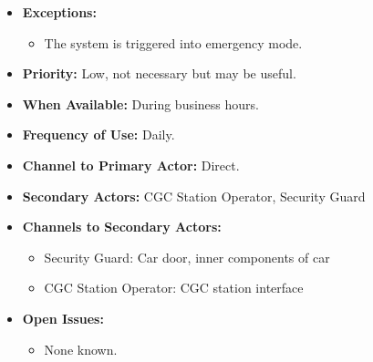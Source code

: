 \documentclass[12pt]{article}
\begin{document}
\begin{itemize}
        \item[]\textbf{Exceptions:}
            \begin{itemize}
                \item[] The system is triggered into emergency mode.
            \end{itemize}

        \item[]\textbf{Priority:}
            Low, not necessary but may be useful.

        \item[]\textbf{When Available:}
            During business hours.

        \item[]\textbf{Frequency of Use:}
            Daily.

        \item[]\textbf{Channel to Primary Actor:}
            Direct.

        \item[]\textbf{Secondary Actors:}
            CGC Station Operator, Security Guard
            
        \item[]\textbf{Channels to Secondary Actors:}
            \begin{itemize}
                \item[] Security Guard: Car door, inner components of car 
                \item[] CGC Station Operator: CGC station interface
            \end{itemize}

        \item[]\textbf{Open Issues:}
            \begin{itemize}
                \item[] None known.
            \end{itemize}
    \end{itemize}
%    
%    
%    
\end{document}
